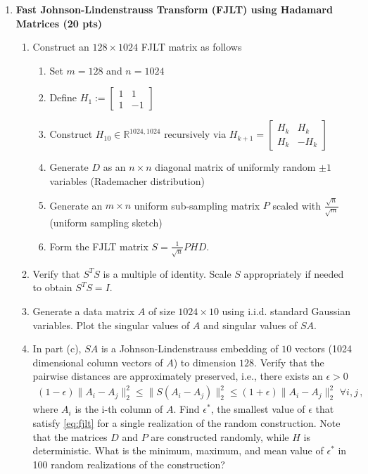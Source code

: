 \begin{enumerate}
\item \textbf{Fast Johnson-Lindenstrauss Transform (FJLT) using Hadamard Matrices (20 pts)}
\begin{enumerate}
    \item Construct an $128 \times 1024$ FJLT matrix as follows
    \begin{enumerate}
        \item[] Set $m=128$ and $n=1024$
        \item[] Define $H_1:= \left[\begin{array}{cc} 1 & 1 \\ 1 & -1  \end{array}\right]$
        \item[] Construct $H_{10} \in \mathbb{R}^{1024,1024}$ recursively via $H_{k+1} = \left[\begin{array}{cc} H_k & H_k \\ H_k & -H_k  \end{array}\right] $
        \item[] Generate $D$ as an $n\times n$ diagonal matrix of uniformly random $\pm 1$ variables (Rademacher distribution) 
        \item[] Generate an $m \times n$ uniform sub-sampling matrix $P$ scaled with $\frac{\sqrt{n}}{\sqrt{m}}$ (uniform sampling sketch)
        \item[] Form the FJLT matrix $S=\frac{1}{\sqrt{n}}PHD$.
        \end{enumerate}
    \item Verify that $S^T S$ is a multiple of identity. Scale $S$ appropriately if needed to obtain $S^T S = I$.
    \item Generate a data matrix $A$ of size $1024\times 10$ using i.i.d. standard Gaussian variables. Plot the singular values of $A$ and singular values of $SA$.
    \item In part (c), $SA$ is a Johnson-Lindenstrauss embedding of $10$ vectors (1024 dimensional column vectors of $A$) to dimension $128$. Verify that the pairwise distances are approximately preserved, i.e., there exists an $\epsilon>0$ 
    \begin{align}
      (1-\epsilon)\|A_i-A_j\|_2^2 \le  \|S(A_i-A_j)\|_2^2\le (1+\epsilon) \|A_i-A_j\|_2^2\,\,\forall i,j\,,\label{eq:fjlt}
    \end{align}
    where $A_i$ is the i-th column of $A$. Find $\epsilon^*$, the smallest value of $\epsilon$ that satisfy \eqref{eq:fjlt} for a single realization of the random construction. Note that the matrices $D$ and $P$ are constructed randomly, while $H$ is deterministic. What is the minimum, maximum, and mean value of $\epsilon^*$ in 100 random realizations of the construction?  \\

\end{enumerate}
\end{enumerate}

